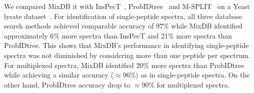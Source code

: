 \documentclass[arial,11pt]{article}
\begin{document}
%

We  compared MixDB it with InsPecT~\cite{tanner05}, ProbIDtree~\cite{zhang2005tree} and M-SPLIT~\cite{wang2010msplit} on a Yeast lysate dataset~\cite{li2009}. For identification of single-peptide spectra, all three database search methods achieved comparable accuracy of $97\%$ while MixDB identified approximately 6\% more spectra than InsPecT and 21\% more spectra than ProbIDtree. This shows that MixDB's performance in identifying single-peptide spectra was not diminished by considering more than one peptide per spectrum.  For multiplexed spectra, MixDB identified $20\%$ more spectra than ProbIDtree while achieving a similar accuracy ($\approx 96\%$) as in single-peptide spectra. On the other hand, ProbIDtree accuracy drop to $\approx 90\%$ for multiplexed spectra.
\end{document}
